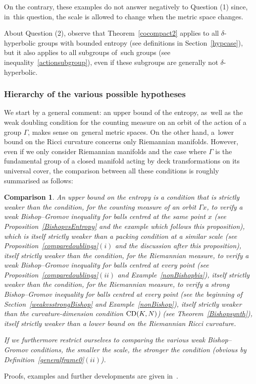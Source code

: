 \documentclass[pdftex]{sigma}
\numberwithin{equation}{section}
\newtheorem{compari}[theor]{Comparison}
\begin{document}
On the contrary, these examples do not answer negatively to Question (1) since, in~this question, the scale is allowed to change when the metric space
changes.

About Question (2), observe that Theorem~\ref{cocompact2} applies to all $\delta$-hyperbolic groups with bounded entropy (see definitions in Section~\ref{hypcase}), but it also applies to all subgroups of~such groups (see inequality~\eqref{actionsubgroup}), even if these subgroups are generally
not
$\delta$-hyperbolic.

\subsubsection{Hierarchy of the various possible hypotheses}\label{comparaison}
We start by a general comment: an upper bound of the entropy, as~well as the weak doubling condition for the counting measure on an orbit of the action of a group $ \Gamma $, makes sense on~gene\-ral metric spaces. On the
other hand, a~lower bound on the Ricci
curvature concerns only Riemannian manifolds.
However, even if we only consider Riemannian manifolds and the case where
$ \Gamma $ is the fundamental group of a closed manifold acting by deck transformations on its universal cover, the comparison between all these conditions is roughly summarised as follows:

\begin{compari}%
An upper bound on the entropy is a condition that is strictly weaker than
the condition, for the counting measure of an orbit $ \Gamma x $, to verify a weak
Bishop--Gromov inequality for balls centred at the same point $x$ (see Proposition~\ref{BishopvsEntropy} and the example which follows this proposition), which
 is itself strictly weaker than a packing condition at a similar scale (see Proposition~\ref{comparedoublings}$(i)$ and
the discussion after this proposition), itself strictly weaker than the condition, for the Riemannian measure, to verify a weak Bishop--Gromov inequality for balls centred
at every point (see Proposition~\ref{comparedoublings}$(ii)$ and Example~\ref{nonBishopbis}), itself strictly weaker than the condition, for the Riemannian measure, to verify a strong Bishop--Gromov inequality for balls centred at every point (see the beginning of Section~\ref{weakvsstrongBishop} and Example~\ref{nonBishop}), itself strictly weaker than the curvature-dimension condition ${\rm CD}(K,N)$) (see Theorem~\ref{Bishopsynth}), itself strictly weaker than a lower bound on the Riemannian Ricci curvature.

If we furthermore restrict ourselves to comparing the various weak Bishop--Gromov conditions, the smaller the scale, the stronger the condition (obvious
by Definition~\ref{generalframe0}$(ii)$).
\end{compari}
Proofs, examples and further developments are given in~\cite[Section~3.3]{BCGS}.
\end{document}
